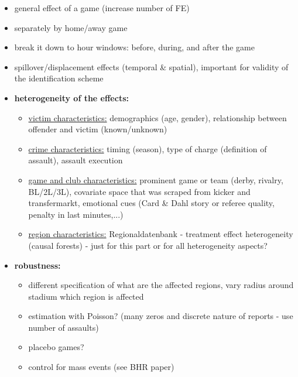 \documentclass[11pt, a4paper]{article} %
\begin{document}
\begin{itemize}
	\item general effect of a game (increase number of FE)
	\item separately by home/away game
	\item break it down to hour windows: before, during, and after the game
	\item spillover/displacement effects (temporal \& spatial), important for validity of the identification scheme
	\item \textbf{heterogeneity of the effects:}
	\begin{itemize}
		\item \underline{victim characteristics:} demographics (age, gender), relationship between offender and victim (known/unknown)
		\item \underline{crime characteristics:} timing (season), type of charge (definition of assault), assault execution
		\item \underline{game and club characteristics:} prominent game or team (derby, rivalry, BL/2L/3L), covariate space that was scraped from kicker and transfermarkt, emotional cues (Card \& Dahl story or referee quality, penalty in last minutes,...)
		\item \underline{region characteristics:} Regionaldatenbank - treatment effect heterogeneity (causal forests) - just for this part or for all heterogeneity aspects?
	\end{itemize}
	\item \textbf{robustness:}
	\begin{itemize}
		\item different specification of what are the affected regions, vary radius around stadium which region is affected
		\item estimation with Poisson? (many zeros and discrete nature of reports - use number of assaults)
		\item placebo games?
		\item control for mass events (see BHR paper)
	\end{itemize}
\end{itemize}













\bigskip
\end{document}
